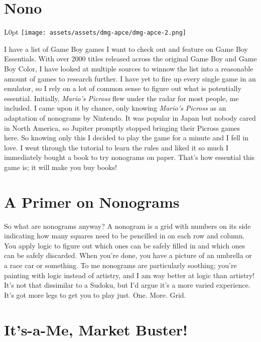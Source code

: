 \documentclass{book}
\begin{document}
\newpage\FloatBarrier\needspace{10mm}\section*{Nono}\nopagebreak[4]
\begin{wrapfigure}{L}{0pt} \texttt{[image: assets/assets/dmg-apce/dmg-apce-2.png]}\end{wrapfigure}
I have a list of Game Boy games I want to check out and feature on Game Boy Essentials. With over 2000 titles released across the original Game Boy and Game Boy Color, I have looked at multiple sources to winnow the list into a reasonable amount of games to research further. I have yet to fire up every single game in an emulator, so I rely on a lot of common sense to figure out what is potentially essential. Initially, \emph{Mario’s Picross} flew under the radar for most people, me included. I came upon it by chance, only knowing \emph{Mario’s Picross} as an adaptation of nonograms by Nintendo. It was popular in Japan but nobody cared in North America, so Jupiter promptly stopped bringing their Picross games here. So knowing only this I decided to play the game for a minute and I fell in love. I went through the tutorial to learn the rules and liked it so much I immediately bought a book to try nonograms on paper. That’s how essential this game is; it will make you buy books!

\FloatBarrier\needspace{10mm}\section*{A Primer on Nonograms}\nopagebreak[4]

So what are nonograms anyway? A nonogram is a grid with numbers on its side indicating how many squares need to be pencilled in on each row and column. You apply logic to figure out which ones can be safely filled in and which ones can be safely discarded. When you’re done, you have a picture of an umbrella or a race car or something. To me nonograms are particularly soothing; you’re painting with logic instead of artistry, and I am way better at logic than artistry! It’s not that dissimilar to a Sudoku, but I’d argue it’s a more varied experience. It’s got more legs to get you to play just. One. More. Grid.

\FloatBarrier\needspace{10mm}\section*{It’s-a-Me, Market Buster!}\nopagebreak[4]
\end{document}
